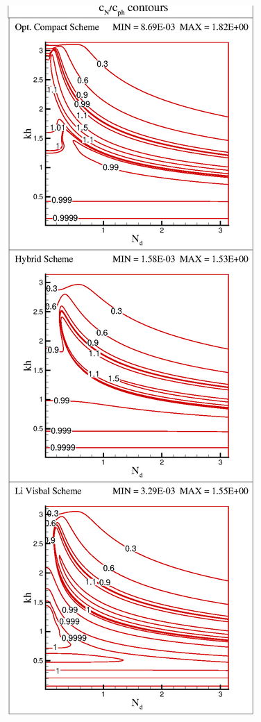 \documentclass{svjour3}                    %
\begin{document}
\begin{figure}[h!]
\includegraphics[scale=0.380]{Fig_7b}

\end{figure}
\end{document}
